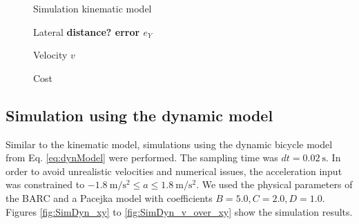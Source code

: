 \begin{figure}[ht]
	\centering
  	
	\caption{Simulation kinematic model} 
	\label{fig:SimKin_xy}
\end{figure}

\begin{figure}[ht]
	\centering
  	
  	\caption{Lateral \bfseries{distance?} error $e_Y$}
	\label{fig:SimKin_eY}
\end{figure}

\begin{figure}[ht]
	\centering
  	
  	\caption{Velocity $v$}
	\label{fig:SimKin_v}
\end{figure}

\begin{figure}[ht]
	\centering
  	
  	\caption{Cost}
	\label{fig:SimKin_cost}
\end{figure}
\subsection{Simulation using the dynamic model}
Similar to the kinematic model, simulations using the dynamic bicycle model from Eq. \eqref{eq:dynModel} were performed. The sampling time was $dt=\SI{0.02}{\second}$. In order to avoid unrealistic velocities and numerical issues, the acceleration input was constrained to $-\SI{1.8}{\meter\per\square\second}\leq a \leq \SI{1.8}{\meter\per\square\second}$. We used the physical parameters of the BARC and a Pacejka model with coefficients $B=5.0, C=2.0, D = 1.0$. Figures \ref{fig:SimDyn_xy} to \ref{fig:SimDyn_v_over_xy} show the simulation results.\\
